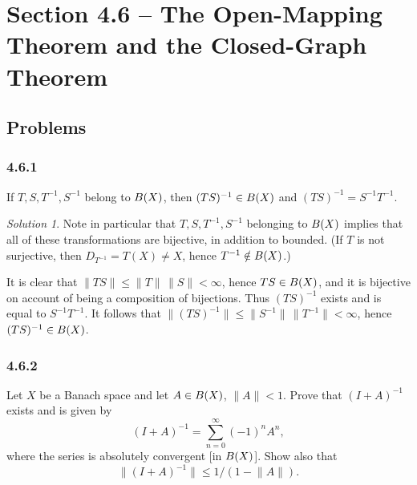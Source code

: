 \documentclass{report}
\newcommand{\norm}[1]{{\lVert #1 \rVert}}
\let\sc\relax
\newcommand{\sc}[1]{\mathscr{#1}}
\theoremstyle{remark}
\newtheorem*{solution}{Solution}
\begin{document}
\section*{Section 4.6 -- The Open-Mapping Theorem and the Closed-Graph Theorem}

\subsection*{Problems}

\subsubsection*{4.6.1}
If $T, S, T^{-1}, S^{-1}$ belong to $\sc B(X)$, then $(TS)^{-1} \in \sc B(X)$ and $(TS)^{-1} = S^{-1} T^{-1}$.

\begin{solution}
  Note in particular that $T, S, T^{-1}, S^{-1}$ belonging to $\sc B(X)$ implies that all of these transformations are bijective, in addition to bounded. (If $T$ is not surjective, then $D_{T^{-1}} = T(X) \ne X$, hence $T^{-1} \notin \sc B(X)$.)

  It is clear that $\norm{TS} \le \norm T \, \norm S < \infty$, hence $TS \in \sc B(X)$, and it is bijective on account of being a composition of bijections. Thus $(TS)^{-1}$ exists and is equal to $S^{-1} T^{-1}$. It follows that $\norm{(TS)^{-1}} \le \norm{S^{-1}} \, \norm{T^{-1}} < \infty$, hence $(TS)^{-1} \in \sc B(X)$.
\end{solution}

\subsubsection*{4.6.2}
Let $X$ be a Banach space and let $A \in \sc B(X)$, $\norm A < 1$. Prove that $(I + A)^{-1}$ exists and is given by
\begin{equation*}
  (I + A)^{-1} = \sum_{n=0}^\infty (-1)^n A^n,
\end{equation*}
where the series is absolutely convergent [in $\sc B(X)$]. Show also that
\begin{equation*}
  \norm{(I + A)^{-1}} \le 1/(1 - \norm A).
\end{equation*}
\end{document}
